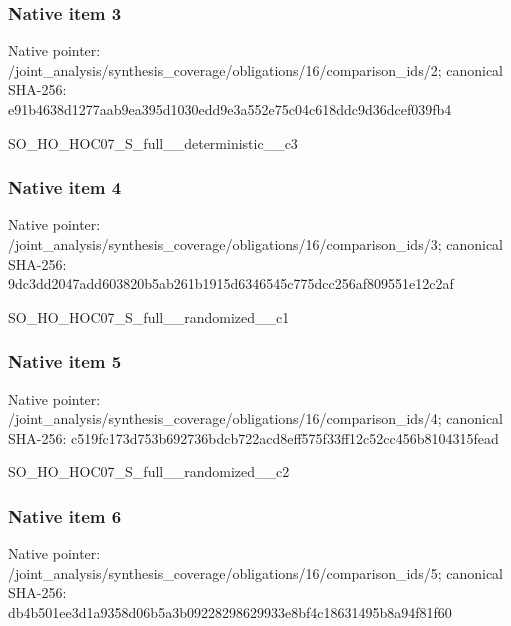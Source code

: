 \documentclass[10pt,a4paper]{article}
\begin{document}
\subsubsection{Native item 3}
Native pointer: /joint\_\allowbreak{}analysis/synthesis\_\allowbreak{}coverage/obligations/16/comparison\_\allowbreak{}ids/2; canonical SHA-256: e91b4638d1277aab9ea395d1030edd9e3a552e75c04c618ddc9d36dcef039fb4

\begingroup\raggedright\sloppy SO\_\allowbreak{}HO\_\allowbreak{}HOC07\_\allowbreak{}S\_\allowbreak{}full\_\allowbreak{}\_\allowbreak{}deterministic\_\allowbreak{}\_\allowbreak{}c3\par\endgroup

\subsubsection{Native item 4}
Native pointer: /joint\_\allowbreak{}analysis/synthesis\_\allowbreak{}coverage/obligations/16/comparison\_\allowbreak{}ids/3; canonical SHA-256: 9dc3dd2047add603820b5ab261b1915d6346545c775dcc256af809551e12c2af

\begingroup\raggedright\sloppy SO\_\allowbreak{}HO\_\allowbreak{}HOC07\_\allowbreak{}S\_\allowbreak{}full\_\allowbreak{}\_\allowbreak{}randomized\_\allowbreak{}\_\allowbreak{}c1\par\endgroup

\subsubsection{Native item 5}
Native pointer: /joint\_\allowbreak{}analysis/synthesis\_\allowbreak{}coverage/obligations/16/comparison\_\allowbreak{}ids/4; canonical SHA-256: c519fc173d753b692736bdcb722acd8eff575f33ff12c52cc456b8104315fead

\begingroup\raggedright\sloppy SO\_\allowbreak{}HO\_\allowbreak{}HOC07\_\allowbreak{}S\_\allowbreak{}full\_\allowbreak{}\_\allowbreak{}randomized\_\allowbreak{}\_\allowbreak{}c2\par\endgroup

\subsubsection{Native item 6}
Native pointer: /joint\_\allowbreak{}analysis/synthesis\_\allowbreak{}coverage/obligations/16/comparison\_\allowbreak{}ids/5; canonical SHA-256: db4b501ee3d1a9358d06b5a3b09228298629933e8bf4c18631495b8a94f81f60
\end{document}
